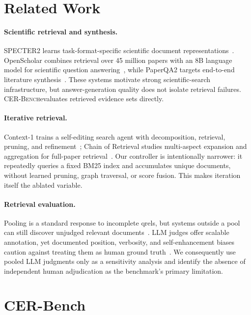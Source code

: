 \documentclass{article}
\newcommand{\cer}{\textsc{CER-Bench}}
\begin{document}
\section{Related Work}
\label{sec:related}

\paragraph{Scientific retrieval and synthesis.}
SPECTER2 learns task-format-specific scientific document representations~\cite{specter2}. OpenScholar combines retrieval over 45 million papers with an 8B language model for scientific question answering~\cite{openscholar2026}, while PaperQA2 targets end-to-end literature synthesis~\cite{skarlinski2024paperqa2}. These systems motivate strong scientific-search infrastructure, but answer-generation quality does not isolate retrieval failures. \cer evaluates retrieved evidence sets directly.

\paragraph{Iterative retrieval.}
Context-1 trains a self-editing search agent with decomposition, retrieval, pruning, and refinement~\cite{context2026}; Chain of Retrieval studies multi-aspect expansion and aggregation for full-paper retrieval~\cite{cor2025}. Our controller is intentionally narrower: it repeatedly queries a fixed BM25 index and accumulates unique documents, without learned pruning, graph traversal, or score fusion. This makes iteration itself the ablated variable.

\paragraph{Retrieval evaluation.}
Pooling is a standard response to incomplete qrels, but systems outside a pool can still discover unjudged relevant documents~\cite{buckley2004incomplete}. LLM judges offer scalable annotation, yet documented position, verbosity, and self-enhancement biases caution against treating them as human ground truth~\cite{zheng2023judge}. We consequently use pooled LLM judgments only as a sensitivity analysis and identify the absence of independent human adjudication as the benchmark's primary limitation.

\section{CER-Bench}
\label{sec:benchmark}
\end{document}
